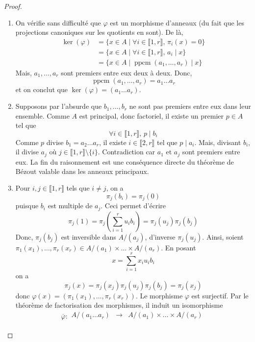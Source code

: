   \begin{proof}
    \begin{enumerate}[label=(\roman*)]
      \item On vérifie sans difficulté que $\varphi$ est un morphisme d'anneaux (du fait que les projections canoniques sur les quotients en sont). De là,
      \begin{align*}
        \ker(\varphi) &= \{ x \in A \mid \forall i \in \llbracket 1, r \rrbracket, \, \pi_i(x) = 0 \} \\
        &= \{ x \in A \mid \forall i \in \llbracket 1, r \rrbracket, \, a_i \mid x \} \\
        &= \{ x \in A \mid \operatorname{ppcm}(a_1, \dots, a_r) \mid x \}
      \end{align*}
      Mais, $a_1, \dots, a_r$ sont premiers entre eux deux à deux. Donc,
      \[ \operatorname{ppcm}(a_1, \dots, a_r) = a_1 \dots a_r \]
      et on conclut que $\ker(\varphi) = (a_1 \dots a_r)$.
      \item Supposons par l'absurde que $b_1, \dots, b_r$ ne sont pas premiers entre eux dans leur ensemble. Comme $A$ est principal, donc factoriel, il existe un premier $p \in A$ tel que
      \[ \forall i \in \llbracket 1, r \rrbracket, \, p \mid b_i \]
      Comme $p$ divise $b_1 = a_2 \dots a_r$, il existe $i \in \llbracket 2, r \rrbracket$ tel que $p \mid a_i$. Mais, divisant $b_i$, il divise $a_j$ où $j \in \llbracket 1, r \rrbracket \setminus \{ i \}$. Contradiction car $a_1$ et $a_j$ sont premiers entre eux. La fin du raisonnement est une conséquence directe du théorème de Bézout valable dans les anneaux principaux.
      \item Pour $i, j \in \llbracket 1, r \rrbracket$ tels que $i \neq j$, on a
      \[ \pi_j(b_i) = \pi_j(0) \]
      puisque $b_i$ est multiple de $a_j$. Ceci permet d'écrire
      \[ \pi_j(1) = \pi_j\left( \sum_{i=1}^{r} u_i b_i \right) = \pi_j(u_j) \pi_j(b_j) \]
      Donc, $\pi_j(b_j)$ est inversible dans $A/(a_j)$, d'inverse $\pi_j(u_j)$. Ainsi, soient $\pi_1(x_1), \dots, \pi_r(x_r) \in A/(a_1) \times \dots \times A/(a_r)$. En posant
      \[ x = \sum_{i=1}^r x_i u_i b_i \]
      on a
      \[ \pi_j(x) = \pi_j(x_j) \pi_j(u_j) \pi_j(b_j) = \pi_j(x_j) \]
      donc $\varphi(x) = (\pi_1(x_1), \dots, \pi_r(x_r))$. Le morphisme $\varphi$ est surjectif. Par le théorème de factorisation des morphismes, il induit un isomorphisme
      \[
        \overline{\varphi} :
        \begin{array}{ccc}
          A/(a_1 \dots a_r) &\rightarrow& A/(a_1) \times \dots \times A/(a_r) \\

\end{array}\]
\end{enumerate}
\end{proof}
